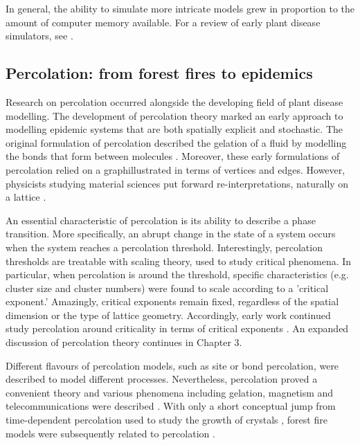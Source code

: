 In general, the ability to simulate more intricate models grew in proportion to the amount of computer memory available.
For a review of early plant disease simulators, see \cite{doi:10.1146/annurev.py.23.090185.002031}.

\subsection{Percolation: from forest fires to epidemics}
\label{section:lit-rev-perc}

Research on percolation occurred alongside the developing field of plant disease modelling. The development of percolation theory marked an early approach to modelling epidemic systems that are
both spatially explicit and stochastic. The original formulation of percolation described the gelation of a fluid by modelling the bonds that form between molecules \cite{perco_origin}. Moreover, these early formulations of percolation relied on a graph\textemdash illustrated in terms of vertices and edges. However, physicists studying material sciences put forward re-interpretations, naturally on a lattice \cite{Essam_1980}. 

An essential characteristic of percolation is its ability to describe a phase transition. More specifically, an abrupt change in the state of a system occurs when the system reaches a percolation threshold. Interestingly, percolation thresholds are treatable with scaling theory, used to study critical phenomena. In particular, when percolation is around the threshold, specific characteristics (e.g. cluster size and cluster numbers) were found to scale according to a 'critical exponent.' Amazingly, critical exponents remain fixed, regardless of the spatial dimension or the type of lattice geometry. Accordingly, early work continued study percolation around criticality in terms of critical exponents \cite{STAUFFER19791}. An expanded discussion of percolation theory continues in Chapter 3.

Different flavours of percolation models, such as site or bond percolation, were described
to model different processes. Nevertheless, percolation proved a convenient theory and various phenomena including gelation, 
magnetism and telecommunications were described \cite{trove.nla.gov.au/work/26493727}. 
With only a short conceptual jump from time-dependent percolation used to study the growth of crystals \cite{Family_1985},
forest fire models were subsequently related to percolation \cite{MacKay_1984}.

